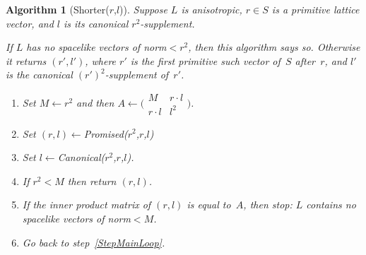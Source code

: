 \documentclass[12pt]{amsart}
\def\twobytwo#1#2#3#4{\bigl(\begin{smallmatrix}#1&#2\\#3&#4\end{smallmatrix}\bigr)
    }
\numberwithin{theorem}{section}
\numberwithin{equation}{section}
\numberwithin{figure}{section}
\newtheorem{algorithm}[theorem]{Algorithm}
\theoremstyle{remark}
\begin{document}
\begin{algorithm}[{\sf Shorter($r$,$l$)}]
    \label{AlgorithmShorter}
	Suppose $L$ is anisotropic, $r\in S$ is a primitive lattice vector,  and $l$ is
	its canonical $r^2$-supplement.  

    If $L$ has no spacelike vectors
    of norm${}<r^2$, then this algorithm says so.
    Otherwise it returns $(r',l')$, where $r'$
    is the first primitive such vector of~$S$ after~$r$,
    and $l'$ is the canonical $(r')^2$-supplement of~$r'$.

	\begin{enumerate}
		\item\relax{\sf[Constants]}
			\label{StepConstants}
            Set $M\leftarrow r^2$ and then $A\leftarrow\twobytwo{M}{r\cdot l}{r\cdot l}{l^2}$.
		\item{}
			\label{StepMainLoop}
			Set $(r,l)\leftarrow{}${\sf Promised($r^2$,$r$,$l$)}
        \item\relax{\sf[Canonicalize]}
            \label{StepCanonicalize}
            Set
			$l\leftarrow{}${\sf Canonical($r^2$,$r$,$l$)}.
		\item\relax{\sf[Found?]}
			\label{StepFound}
			If $r^2<M$ then return $(r,l)$.
		\item\relax{\sf[Nonexistence?]}
			\label{StepNonexistence}
			If the inner product matrix of $(r,l)$ is equal to~$A$, then stop: $L$ contains no
			spacelike vectors of norm${}<M$.
		\item\relax{\sf[Repeat]}
			\label{StepRepeat}
			Go back to step~\ref{StepMainLoop}.
	\end{enumerate}
\end{algorithm}
\end{document}
